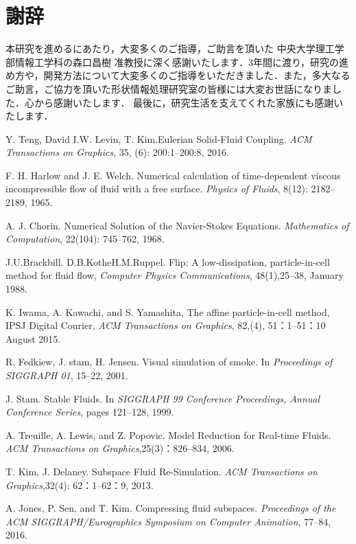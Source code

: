 \documentclass[a4j,12pt]{jreport}
\def\syaji{ \chapter*{謝辞} \addcontentsline{toc}{chapter}{謝辞}}
\begin{document}
\syaji
\par
本研究を進めるにあたり，大変多くのご指導，ご助言を頂いた
中央大学理工学部情報工学科の森口昌樹 准教授に深く感謝いたします．3年間に渡り，研究の進め方や，開発方法について大変多くのご指導をいただきました．また，多大なるご助言，ご協力を頂いた形状情報処理研究室の皆様には大変お世話になりました．心から感謝いたします．
最後に，研究生活を支えてくれた家族にも感謝いたします．
\begin{thebibliography}{99}
Y. Teng, David I.W. Levin, T. Kim.Eulerian Solid-Fluid Coupling. \textit{ACM Transactions on Graphics}, 35, (6):  200:1--200:8, 2016.

F. H. Harlow and J. E. Welch. Numerical calculation of time-dependent viscous incompressible flow of fluid with a free surface. \textit{Physics of Fluids}, 8(12): 2182--2189, 1965.

A. J. Chorin. Numerical Solution of the Navier-Stokes Equations. \textit{Mathematics of Computation}, 22(104): 745--762, 1968.

J.U.Brackbill. D.B.KotheH.M.Ruppel. Flip: A low-dissipation, particle-in-cell method for fluid flow, \textit{Computer Physics Communications}, 48(1),25--38, January 1988.

K. Iwama, A. Kawachi, and S. Yamashita, The affine particle-in-cell method, IPSJ Digital Courier, \textit{ACM Transactions on Graphics}, 82,(4), 51：1--51：10 August 2015.

R. Fedkiew, J. stam, H. Jensen. Visual simulation of smoke. In \textit{Proceedings of SIGGRAPH 01}, 15--22, 2001.

J. Stam. Stable Fluids. In \textit{SIGGRAPH 99 Conference Proceedings, Annual Conference Series}, pages 121--128, 1999.

A. Treuille, A. Lewis, and Z. Popovic. Model Reduction for Real-time Fluids. \textit{ACM Transactions on Graphics},25(3)：826--834, 2006.

T. Kim, J. Delaney. Subspace Fluid Re-Simulation. \textit{ACM Transactions on Graphics},32(4): 62：1--62：9, 2013.

A. Jones, P. Sen, and T. Kim. Compressing fluid subspaces. \textit{Proceedings of the ACM SIGGRAPH/Eurographics Symposium on Computer Animation}, 77--84, 2016.


\end{thebibliography}
\end{document}
